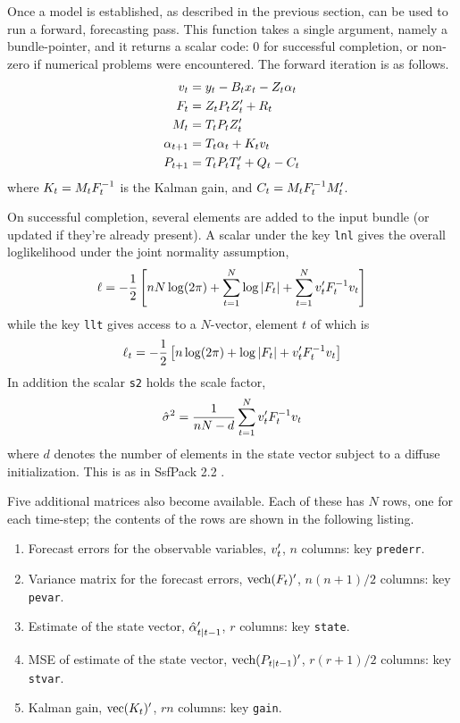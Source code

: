 Once a model is established, as described in the previous section,
 can be used to run a forward, forecasting pass.  This
function takes a single argument, namely a bundle-pointer, and it
returns a scalar code: 0 for successful completion, or non-zero if
numerical problems were encountered. The forward iteration is as
follows.
%
\begin{align*}
  v_t &= y_t - B_tx_t - Z_t \alpha_t \\
  F_t &= Z_t P_t Z_t' + R_t \\
  M_t &= T_t P_t Z_t'\\
  \alpha_{t+1} &= T_t \alpha_t + K_t v_t \\
  P_{t+1} &= T_t P_t T_t' + Q_t - C_t\\
\end{align*}
%
where $K_t = M_tF^{-1}_t$ is the Kalman gain, and
$C_t = M_tF^{-1}_tM'_t$.

On successful completion, several elements are added to the input
bundle (or updated if they're already present).  A scalar under the
key \texttt{lnl} gives the overall loglikelihood under the joint
normality assumption,
%
\[
  \ell = -\frac{1}{2} \left[nN \log(2 \pi) + \sum_{t=1}^N\log \left|F_t\right| +
    \sum_{t=1}^Nv_t'F_t^{-1} v_t
  \right]
\]
%
while the key \texttt{llt} gives access to a $N$-vector, element $t$ of
which is
%
\[
  \ell_t = -\frac{1}{2} \left[n \log(2 \pi) + \log \left|F_t\right| +
    v_t'F_t^{-1} v_t
  \right]
\]
In addition the scalar \texttt{s2} holds the scale factor,
%
\[
\hat{\sigma}^2 = \frac{1}{nN-d}
   \sum_{t=1}^Nv_t'F_t^{-1} v_t
 \]
where $d$ denotes the number of elements in the state vector subject
to a diffuse initialization. This is as in \textsf{SsfPack 2.2}
\citep{koopman-etal99}.

Five additional matrices also become available.  Each of these has $N$
rows, one for each time-step; the contents of the rows are shown in
the following listing.
%
\begin{enumerate}
\item Forecast errors for the observable variables, $v_t'$, $n$
  columns: key \texttt{prederr}.
\item Variance matrix for the forecast errors, $\mbox{vech}(F_t)'$,
  $n(n+1)/2$ columns: key \texttt{pevar}.
\item Estimate of the state vector, $\hat{\alpha}_{t|t-1}'$, $r$
  columns: key \texttt{state}.
\item MSE of estimate of the state vector,
  $\mbox{vech}(P_{t|t-1})'$, $r(r+1)/2$ columns: key \texttt{stvar}.
\item Kalman gain, $\mbox{vec}(K_t)'$, $rn$ columns: key
  \texttt{gain}.
\end{enumerate}

